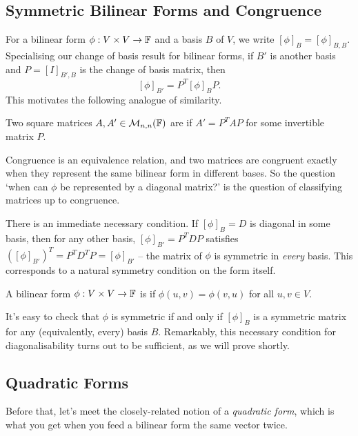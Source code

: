 \documentclass[a4paper]{scrartcl}
\begin{document}
\subsection{Symmetric Bilinear Forms and Congruence}

For a bilinear form $\phi: V \times V \rightarrow \mathbb{F}$ and a basis $B$ of $V$, we write $[\phi]_B = [\phi]_{B, B}$. Specialising our change of basis result for bilinear forms, if $B'$ is another basis and $P = [I]_{B', B}$ is the change of basis matrix, then
$$
[\phi]_{B'} = P^T [\phi]_B P.
$$
This motivates the following analogue of similarity.

\begin{definition}
    Two square matrices $A, A' \in \mathcal{M}_{n,n}(\mathbb{F})$ are  if $A' = P^T A P$ for some invertible matrix $P$.
\end{definition}

Congruence is an equivalence relation, and two matrices are congruent exactly when they represent the same bilinear form in different bases. So the question `when can $\phi$ be represented by a diagonal matrix?' is the question of classifying matrices up to congruence.

There is an immediate necessary condition. If $[\phi]_B = D$ is diagonal in some basis, then for any other basis, $[\phi]_{B'} = P^TDP$ satisfies $([\phi]_{B'})^T = P^T D^T P = [\phi]_{B'}$ -- the matrix of $\phi$ is symmetric in \emph{every} basis. This corresponds to a natural symmetry condition on the form itself.

\begin{definition}
    A bilinear form $\phi: V \times V \rightarrow \mathbb{F}$ is  if $\phi(u, v) = \phi(v, u)$ for all $u, v \in V$.
\end{definition}

It's easy to check that $\phi$ is symmetric if and only if $[\phi]_B$ is a symmetric matrix for any (equivalently, every) basis $B$. Remarkably, this necessary condition for diagonalisability turns out to be sufficient, as we will prove shortly.

\subsection{Quadratic Forms}

Before that, let's meet the closely-related notion of a \emph{quadratic form}, which is what you get when you feed a bilinear form the same vector twice.
\end{document}
